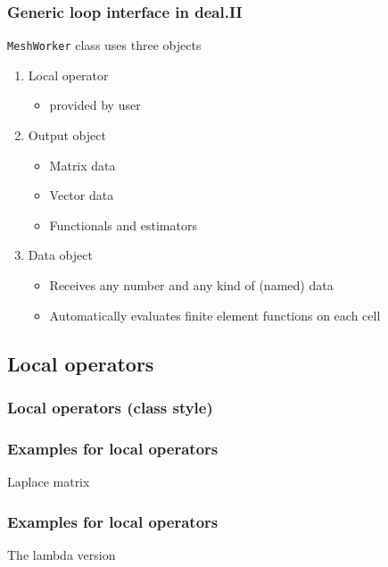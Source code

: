 \begin{frame}
  \frametitle{Generic loop interface in deal.II}
  \lstinline!MeshWorker! class uses three objects
  \begin{enumerate}
  \item Local operator
    \begin{itemize}
    \item  provided by user
    \end{itemize}
  \item Output object
      \begin{itemize}
      \item Matrix data
      \item Vector data
      \item Functionals and estimators
      \end{itemize}
  \item Data object
      \begin{itemize}
      \item Receives any number and any kind of (named) data
      \item Automatically evaluates finite element functions on each cell
      \end{itemize}
  \end{enumerate}
\end{frame}

\subsection{Local operators}

\begin{frame}
  \frametitle{Local operators (class style)}
  \begin{block}{}
    
  \end{block}
\end{frame}

\begin{frame}
  \frametitle{Examples for local operators}
  \begin{block}{Laplace matrix}
    
  \end{block}
\end{frame}

\begin{frame}
  \frametitle{Examples for local operators}
  \begin{block}{The lambda version}
    
  \end{block}
\end{frame}

